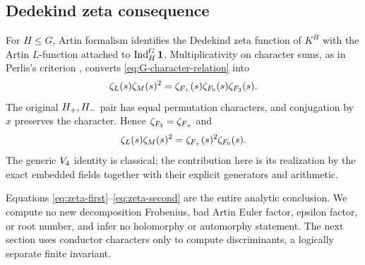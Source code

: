 \subsection{Dedekind zeta consequence}

For $H\le G$, Artin formalism identifies the Dedekind zeta function of
$K^H$ with the Artin $L$-function attached to
$\operatorname{Ind}_H^G\mathbf{1}$.  Multiplicativity on character sums, as in Perlis's
criterion \citep{perlis1977equation}, converts
\eqref{eq:G-character-relation} into
\begin{equation}
 \zeta_L(s)\zeta_M(s)^2
 =\zeta_{F_{+}}(s)\zeta_{F_{0}}(s)\zeta_{F_{3}}(s).
 \label{eq:zeta-first}
\end{equation}
The original $H_{+},H_{-}$ pair has equal permutation characters, and
conjugation by $x$ preserves the character.  Hence
$\zeta_{F_{3}}=\zeta_{F_{+}}$ and
\begin{equation}
 \zeta_L(s)\zeta_M(s)^2
 =\zeta_{F_{+}}(s)^2\zeta_{F_{0}}(s).
 \label{eq:zeta-second}
\end{equation}
The generic $V_4$ identity is classical; the contribution here is its
realization by the exact embedded fields together with their explicit
generators and arithmetic.

Equations \eqref{eq:zeta-first}--\eqref{eq:zeta-second} are the entire
analytic conclusion.  We compute no new decomposition Frobenius, bad Artin
Euler factor, epsilon factor, or root number, and infer no holomorphy or
automorphy statement.  The next section uses conductor characters only to
compute discriminants, a logically separate finite invariant.
